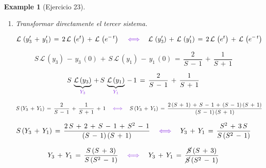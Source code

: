 \documentclass[a4paper,11pt,openany]{book}
\newtheorem{exmp}{Example}[section]
\newcommand*{\itembolasazules}[1]{%
\footnotesize\protect\tikz[baseline=-3pt]%
\protect\node[scale=.7, circle, shade, ball
color=green]{\color{white}\Large\bf#1};}
\begin{document}
\begin{exmp}[Ejercicio 23]
\begin{enumerate}[label=\itembolasazules{\arabic*}]
$$S\,\mathcal{L}\,(y_{2})\,-\,y_{2}\,(0)\,+\,S\,\mathcal{L}\,(y_{3})\,-\,y_{3}\,(0)\,=\,\dfrac{1}{S\,-\,1} \quad \textcolor{blue-violet}{\iff} \quad S\,\underbrace{\mathcal{L}\,(y_{2})}_{\textcolor{blue-violet}{Y_{2}} }\,-\,1\,+\,S\,\underbrace{\mathcal{L}\,(y_{3})}_{\textcolor{blue-violet}{Y_{3}}}\,=\,\dfrac{1}{S\,-\,1}$$
 
$$S\,(Y_{2}\,+\,Y_{3})\,=\,\dfrac{1}{S\,-\,1}\,+\,1 \quad \textcolor{blue-violet}{\iff} \quad Y_{2}\,+\,Y_{3}\,=\,\dfrac{1\,+\,S\,-\,1}{S\,(S\,-\,1)} \quad \textcolor{blue-violet}{\iff} \quad Y_{2}\,+\,Y_{3}\,=\,\dfrac{\cancel{S}}{\cancel{S}\,(S\,-\,1)}$$
 
\begin{center}
\end{center}
 
\item Transformar directamente el tercer sistema.
 
$$\mathcal{L}\,\left(y_{3}'\,+\,y_{1}' \right)\,=\,2\,\mathcal{L}\,\left(e^{t} \right)\,+\,\mathcal{L}\,\left(e^{-\,t} \right) \quad \textcolor{blue-violet}{\iff} \quad \mathcal{L}\,\left(y_{3}' \right)\,+\,\mathcal{L}\,\left(y_{1}' \right)\,=\,2\,\mathcal{L}\,\left(e^{t} \right)\,+\,\mathcal{L}\,\left(e^{-\,t} \right)$$
 
$$S\,\mathcal{L}\,(y_{3})\,-\,y_{3}\,(0)\,+\,S\,\mathcal{L}\,(y_{1})\,-\,y_{1}\,(0)\,=\,\dfrac{2}{S\,-\,1}\,+\,\dfrac{1}{S\,+\,1} $$
 
$$S\,\underbrace{\mathcal{L}\,(y_{3})}_{\textcolor{blue-violet}{Y_{3}} }\,+\,S\,\underbrace{\mathcal{L}\,(y_{1})}_{\textcolor{blue-violet}{Y_{1}}}\,-\,1\,=\,\dfrac{2}{S\,-\,1}\,+\,\dfrac{1}{S\,+\,1}$$
 
$$S\,(Y_{3}\,+\,Y_{1})\,=\,\dfrac{2}{S\,-\,1}\,+\,\dfrac{1}{S\,+\,1}\,+\,1 \quad \textcolor{blue-violet}{\iff} \quad S\,(Y_{3}\,+\,Y_{1})\,=\,\dfrac{2\,(S\,+\,1)\,+\,S\,-\,1\,+\,(S\,-\,1)\,(S\,+\,1)}{(S\,-\,1)\,(S\,+\,1) }$$
 
$$S\,(Y_{3}\,+\,Y_{1})\,=\,\dfrac{2\,S\,+\,2\,+\,S\,-\,1\,+\,S^{2}\,-\,1}{(S\,-\,1)\,(S\,+\,1) } \quad \textcolor{blue-violet}{\iff} \quad Y_{3}\,+\,Y_{1}\,=\,\dfrac{S^{2}\,+\,3\,S }{S\,(S^{2}\,-\,1) }$$
 
$$Y_{3}\,+\,Y_{1}\,=\,\dfrac{S\,(S\,+\,3)}{S\,(S^{2}\,-\,1)} \quad \textcolor{blue-violet}{\iff} \quad Y_{3}\,+\,Y_{1}\,=\,\dfrac{\cancel{S}\,(S\,+\,3)}{\cancel{S}\,(S^{2}\,-\,1)}$$
 
\begin{center}
\end{center}
 

\end{enumerate}
\end{exmp}
\end{document}
